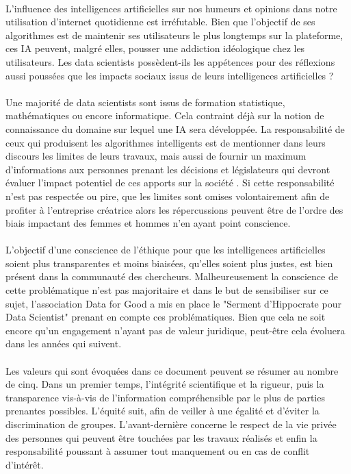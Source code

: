 \documentclass[10pt, french, a4paper]{report}
\begin{document}
\paragraph{}
L’influence des intelligences artificielles sur nos humeurs et opinions dans notre utilisation d’internet quotidienne est irréfutable. Bien que l’objectif de ses algorithmes est de maintenir ses utilisateurs le plus longtemps sur la plateforme, ces IA peuvent, malgré elles, pousser une addiction idéologique chez les utilisateurs. Les data scientists possèdent-ils les appétences pour des réflexions aussi poussées que les impacts sociaux issus de leurs intelligences artificielles ?

\paragraph{}
Une majorité de data scientists sont issus de formation statistique, mathématiques ou encore informatique. Cela contraint déjà sur la notion de connaissance du domaine sur lequel une IA sera développée. La responsabilité de ceux qui produisent les algorithmes intelligents est de mentionner dans leurs discours les limites de leurs travaux, mais aussi de fournir un maximum d’informations aux personnes prenant les décisions et législateurs qui devront évaluer l’impact potentiel de ces apports sur la société \citep{cointe_ethical_2017}. Si cette responsabilité n’est pas respectée ou pire, que les limites sont omises volontairement afin de profiter à l’entreprise créatrice alors les répercussions peuvent être de l’ordre des biais impactant des femmes et hommes n’en ayant point conscience.

\paragraph{}
L’objectif d’une conscience de l’éthique pour que les intelligences artificielles soient plus transparentes et moins biaisées, qu’elles soient plus justes, est bien présent dans la communauté des chercheurs. Malheureusement la conscience de cette problématique n’est pas majoritaire et dans le but de sensibiliser sur ce sujet, l’association Data for Good a mis en place le "Serment d’Hippocrate pour Data Scientist" \citep{data_for_good_serment_2018} prenant en compte ces problématiques. Bien que cela ne soit encore qu’un engagement n’ayant pas de valeur juridique, peut-être cela évoluera dans les années qui suivent.

\paragraph{}
Les valeurs qui sont évoquées dans ce document peuvent se résumer au nombre de cinq. Dans un premier temps, l’intégrité scientifique et la rigueur, puis la transparence vis-à-vis de l’information compréhensible par le plus de parties prenantes possibles. L’équité suit, afin de veiller à une égalité et d’éviter la discrimination de groupes. L’avant-dernière concerne le respect de la vie privée des personnes qui peuvent être touchées par les travaux réalisés et enfin la responsabilité poussant à assumer tout manquement ou en cas de conflit d’intérêt.
\end{document}
